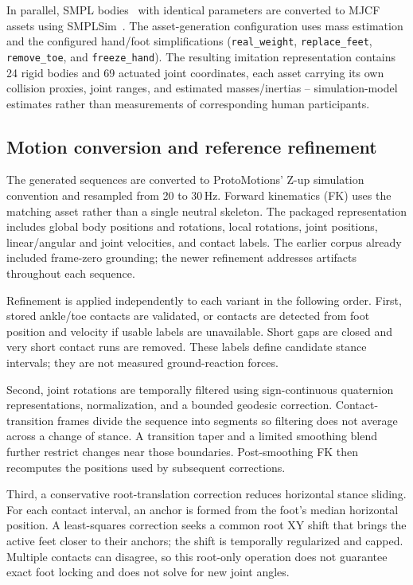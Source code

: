 In parallel, SMPL bodies~\cite{smpl} with identical parameters are converted
to MJCF assets using SMPLSim~\cite{smplsim}. The asset-generation configuration
uses mass estimation and the configured hand/foot simplifications
(\texttt{real\_weight}, \texttt{replace\_feet}, \texttt{remove\_toe}, and
\texttt{freeze\_hand}). The resulting imitation representation contains
24 rigid bodies and 69 actuated joint coordinates, each asset carrying its own
collision proxies, joint ranges, and estimated masses/inertias -- simulation-model
estimates rather than measurements of corresponding human participants.

\subsection{Motion conversion and reference refinement}\label{sec:refinement}

The generated sequences are converted to ProtoMotions' Z-up simulation
convention and resampled from 20 to 30\,Hz. Forward kinematics (FK) uses the
matching asset rather than a single neutral skeleton. The packaged
representation includes global body positions and rotations, local rotations,
joint positions, linear/angular and joint velocities, and contact labels.
The earlier corpus already included frame-zero grounding; the newer
refinement addresses artifacts throughout each sequence.

Refinement is applied independently to each variant in the following order.
First, stored ankle/toe contacts are validated, or contacts are detected from
foot position and velocity if usable labels are unavailable. Short gaps are
closed and very short contact runs are removed. These labels define candidate
stance intervals; they are not measured ground-reaction forces.

Second, joint rotations are temporally filtered using sign-continuous
quaternion representations, normalization, and a bounded geodesic correction.
Contact-transition frames divide the sequence into segments so filtering does
not average across a change of stance. A transition taper and a limited
smoothing blend further restrict changes near those boundaries.
Post-smoothing FK then recomputes the positions used by subsequent corrections.

Third, a conservative root-translation correction reduces horizontal stance
sliding. For each contact interval, an anchor is formed from the foot's median
horizontal position. A least-squares correction seeks a common root XY shift
that brings the active feet closer to their anchors; the shift is temporally
regularized and capped. Multiple contacts can disagree, so this root-only
operation does not guarantee exact foot locking and does not solve for new
joint angles.

